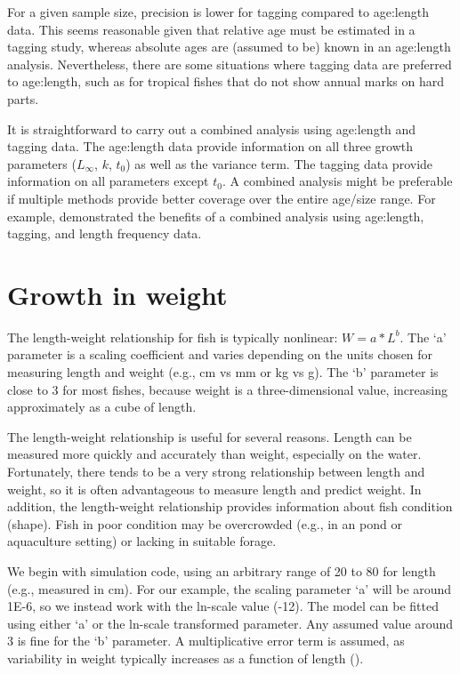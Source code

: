 \documentclass[
]{krantz}
\begin{document}
For a given sample size, precision is lower for tagging compared to age:length data. This seems reasonable given that relative age must be estimated in a tagging study, whereas absolute ages are (assumed to be) known in an age:length analysis. Nevertheless, there are some situations where tagging data are preferred to age:length, such as for tropical fishes that do not show annual marks on hard parts.

It is straightforward to carry out a combined analysis using age:length and tagging data. The age:length data provide information on all three growth parameters (\(L_\infty\), \(k\), \(t_0\)) as well as the variance term. The tagging data provide information on all parameters except \(t_0\). A combined analysis might be preferable if multiple methods provide better coverage over the entire age/size range. For example, \citet{scherrer.etal2021} demonstrated the benefits of a combined analysis using age:length, tagging, and length frequency data.

\hypertarget{LnWgt}{%
\section{Growth in weight}\label{LnWgt}}

The length-weight relationship for fish is typically nonlinear: \(W=a*L^b\). The `a' parameter is a scaling coefficient and varies depending on the units chosen for measuring length and weight (e.g., cm vs mm or kg vs g). The `b' parameter is close to 3 for most fishes, because weight is a three-dimensional value, increasing approximately as a cube of length.

The length-weight relationship is useful for several reasons. Length can be measured more quickly and accurately than weight, especially on the water. Fortunately, there tends to be a very strong relationship between length and weight, so it is often advantageous to measure length and predict weight. In addition, the length-weight relationship provides information about fish condition (shape). Fish in poor condition may be overcrowded (e.g., in an pond or aquaculture setting) or lacking in suitable forage.

We begin with simulation code, using an arbitrary range of 20 to 80 for length (e.g., measured in cm). For our example, the scaling parameter `a' will be around 1E-6, so we instead work with the ln-scale value (-12). The model can be fitted using either `a' or the ln-scale transformed parameter. Any assumed value around 3 is fine for the `b' parameter. A multiplicative error term is assumed, as variability in weight typically increases as a function of length (\citet{hayes.brodziack1997}).
\end{document}
